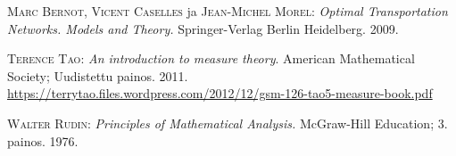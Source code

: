 
\appendix
\backmatter
\begin{thebibliography}{30}


\textsc{Marc Bernot}, \textsc{Vicent Caselles} ja \textsc{Jean-Michel Morel}:
\textit{Optimal Transportation Networks. Models and Theory.}
Springer-Verlag Berlin Heidelberg. 2009.

\textsc{Terence Tao}:
\textit{An introduction to measure theory}.
American Mathematical Society; Uudistettu painos. 2011. \\
\url{https://terrytao.files.wordpress.com/2012/12/gsm-126-tao5-measure-book.pdf}

\textsc{Walter Rudin}:
\textit{Principles of Mathematical Analysis.}
McGraw-Hill Education; 3. painos. 1976.


\end{thebibliography}
